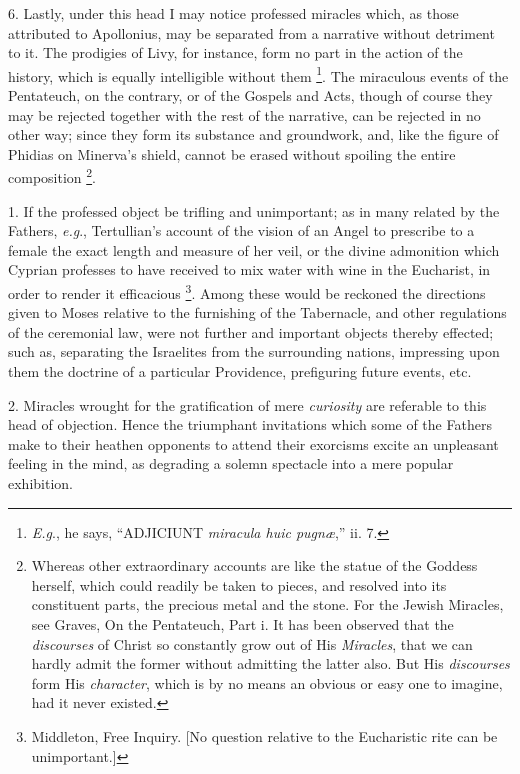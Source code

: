 6. Lastly, under this head I may notice professed
miracles which, as those attributed to Apollonius, may be separated
from a narrative without detriment to it. The prodigies of Livy, for
instance, form no part in the action of the history, which is equally
intelligible without them \footnote{\emph{E.g}., he says,
``ADJICIUNT
\emph{miracula huic pugnæ},'' ii. 7.}. The miraculous events of the
Pentateuch, on the contrary, or of the Gospels and Acts, though of
course they may be rejected together with the rest of the narrative,
can be rejected in no other way; since they form its substance and
groundwork, and, like the figure of Phidias on Minerva's
shield, cannot be erased without spoiling the entire composition \footnote{Whereas other extraordinary accounts are like
the statue of the Goddess herself, which could readily be taken to
pieces, and resolved into its constituent parts, the precious metal
and the stone. For the Jewish Miracles, see Graves, On the Pentateuch,
Part i. It has been observed that the \emph{discourses} of Christ so
constantly grow out of His \emph{Miracles}, that we can hardly admit
the former without admitting the latter also. But His \emph{discourses}
form His \emph{character}, which is by no means an obvious or easy one
to imagine, had it never existed.}.


1. If the professed object be trifling and
unimportant; as in many related by the Fathers, \emph{e.g}.,
Tertullian's account of the vision of an Angel to prescribe to a
female the exact length and measure of her veil, or the divine
admonition which Cyprian professes to have received to mix water with
wine in the Eucharist, in order to render it efficacious \footnote{Middleton, Free Inquiry. [No question
relative to the Eucharistic rite can be unimportant.]}.
Among these would be reckoned the directions given to Moses relative
to the furnishing of the Tabernacle, and other regulations of the
ceremonial law, were not further and important objects thereby
effected; such as, separating the Israelites from the surrounding
nations, impressing upon them the doctrine of a particular Providence,
prefiguring future events, etc.

2. Miracles wrought for the gratification of mere
\emph{curiosity} are referable to this head of objection. Hence the
triumphant invitations which some of the Fathers make to their heathen
opponents to attend their exorcisms excite an unpleasant feeling in
the mind, as degrading a solemn spectacle into a mere popular
exhibition.

